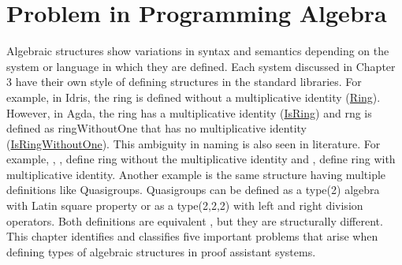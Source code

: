 \chapter{Problem in Programming Algebra}
Algebraic structures show variations in syntax and semantics depending on the
system or language in which they are defined. Each system discussed in Chapter 3
have their own style of defining structures in the standard libraries. For
example, in Idris, the ring is defined without a multiplicative identity
(\href{https://github.com/idris-lang/Idris2/blob/78ff2059f39cb65ad9ed09dec1416621b6e662a5/libs/contrib/Control/Algebra.idr#L85}{Ring}).
However, in Agda, the ring has a multiplicative identity
(\href{https://github.com/agda/agda-stdlib/blob/42d13fdea1b1861e545c5a0799d605edfa0acc31/src/Algebra/Structures.agda#L459}{IsRing})
and rng is defined as ringWithoutOne that has no multiplicative identity
(\href{https://github.com/agda/agda-stdlib/blob/f7bfeba6cfc03b9488e6d91ea0b011831f53be8a/src/Algebra/Structures.agda#L626}{IsRingWithoutOne}).
This ambiguity in naming is also seen in literature. For example,
\cite{anh1987morita}, \cite{jacobson1956structure},
\cite{persson1999application} define ring without the multiplicative identity
and \cite{lehmann1977algebraic}, \cite{geuvers2002constructive} define ring with
multiplicative identity. Another example is the same structure having multiple
definitions like Quasigroups. Quasigroups can be defined as a type(2) algebra
with Latin square property or as a type(2,2,2) with left and right division
operators. Both definitions are equivalent \cite{shcherbacov2003elements}, but
they are structurally different. This chapter identifies and classifies five
important problems that arise when defining types of algebraic structures in
proof assistant systems.

